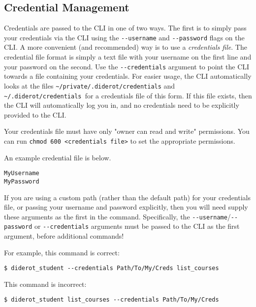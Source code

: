 \subsection{Credential Management}
Credentials are passed to the CLI in one of two ways. 
%
The first is to simply pass your credentials via the CLI using the \verb|--username| and \verb|--password| flags on the CLI. 
%
A more convenient (and recommended) way is to use a \emph{credentials file}.
%
The credential file format is simply a text file with your username on the first line and your password on the second. 
%
Use the \verb|--credentials| argument to point the CLI towards a file containing your credentials.
%
For easier usage, the CLI automatically looks at the files \verb|~/private/.diderot/credentials| and \verb|~/.diderot/credentials |for a credentials file of this form. 
%
If this file exists, then the CLI will automatically log you in, and no credentials need to be explicitly provided to the CLI.
%

\begin{important}
Your credentials file must have only "owner can read and write" permissions. 
%
You can  run \verb|chmod 600 <credentials file>| to set the appropriate permissions.
\end{important}

\begin{example}
An example credential file is below.
\begin{verbatim}
MyUsername
MyPassword
\end{verbatim}
\end{example}

\begin{important}
If you are using a custom path (rather than the default path) for your credentials file, or passing your username and password explicitly, then you will need supply these arguments as the first in the command.
%
Specifically, the
%
\verb|--username|/\verb|--password| or \verb|--credentials| 
%
arguments must be passed to the CLI as the first argument, before
additional commands!

For example, this command is correct:
\begin{verbatim}
$ diderot_student --credentials Path/To/My/Creds list_courses
\end{verbatim}
  
This command is incorrect:
\begin{verbatim}
$ diderot_student list_courses --credentials Path/To/My/Creds
\end{verbatim}
\end{important}


